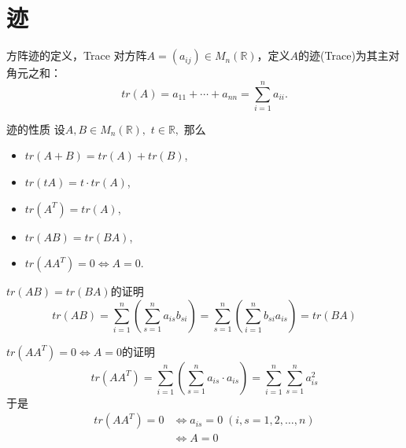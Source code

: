 
\section{迹}


\begin{frame}

\begin{block}{方阵迹的定义，Trace}
对方阵$A = (a_{ij}) \in M_n(\mathbb{R})$，定义$A$的迹(Trace)为其主对角元之和：
\[tr(A) = a_{11} + \cdots + a_{nn} = \sum\limits_{i=1}^n a_{ii}.\]
\end{block}

\pause

\begin{block}{迹的性质}
设$A,B\in M_n(\mathbb{R}),$ $t\in \mathbb{R},$ 那么
\begin{itemize}
\item $tr(A+B) = tr(A) + tr(B)$,
\item $tr(tA) = t\cdot tr(A)$,
\item $tr(A^T) = tr(A)$,
\item $tr(AB) = tr(BA)$,
\item $tr(AA^T) = 0 \Longleftrightarrow A = 0$.
\end{itemize}
\end{block}

\end{frame}


\begin{frame}

\begin{block}{$tr(AB) = tr(BA)$的证明}
\[tr(AB) = \sum\limits_{i=1}^n \left( \sum\limits_{s=1}^n a_{is}b_{si} \right) = \sum\limits_{s=1}^n \left( \sum\limits_{i=1}^n b_{si}a_{is} \right) = tr(BA)\]
\end{block}

\pause

\begin{block}{$tr(AA^T) = 0 \Longleftrightarrow A = 0$的证明}
\[tr(AA^T) = \sum\limits_{i=1}^n \left( \sum\limits_{s=1}^n a_{is}\cdot a_{is} \right) = \sum\limits_{i=1}^n \sum\limits_{s=1}^n a^2_{is}\]
于是
\begin{align*}
tr(AA^T) = 0 & \Longleftrightarrow a_{is} = 0 \; (i,s = 1,2,\ldots,n) \\
 & \Longleftrightarrow A = 0
\end{align*}
\end{block}

\end{frame}

